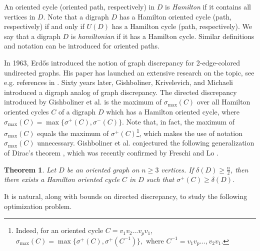 \documentclass{article}
\newtheorem{theorem}{Theorem}[section]
\newcommand{\GGnn}[1]{{#1}}
\newcommand{\2}{\vspace{0.2cm}}
\begin{document}
An oriented cycle (oriented path, respectively) in $D$ is \emph{Hamilton} if it contains all vertices in $D$. Note that a digraph $D$ has a Hamilton oriented cycle (path, respectively) if and only if $U(D)$ has a Hamilton cycle (path, respectively). We say that a digraph $D$ is \emph{hamiltonian} if it has a Hamilton cycle. Similar definitions and notation can be introduced for oriented paths.




\GGnn{In 1963, Erd{\H o}s \cite{Erd63} introduced the notion of graph discrepancy for 2-edge-colored undirected graphs. His paper has launched an extensive research on the topic, see e.g. references in \cite{FL24,GKM23}. Sixty years later, Gishboliner, Krivelevich, and Michaeli \cite{GKM23} introduced a digraph analog of graph discrepancy. The directed discrepancy introduced by Gishboliner et al.  is the maximum of $\sigma_{\max}(C)$ over all Hamilton oriented cycles $C$ of a digraph $D$ which has a Hamilton oriented cycle, where $\sigma_{\max}(C)=\max\{\sigma^+(C),\sigma^-(C)\}$. Note that, in fact, the maximum of $\sigma_{\max}(C)$ equals the maximum of $\sigma^+(C)$\footnote{Indeed, for an oriented cycle $C=v_1v_2\dots v_pv_1$, $\sigma_{\max}(C)=\max\{\sigma^+(C),\sigma^+(C^{-1})\},$ where $C^{-1}=v_1v_p\dots ,v_2v_1$.}, which makes the use of notation $\sigma_{\max}(C)$ unnecessary.}
Gishboliner et al.  conjectured the following generalization of Dirac's theorem \cite{D52}, which was recently confirmed by Freschi and Lo \cite{FL24}. 

\begin{theorem}\label{Dirac-type theorem}
	Let $D$ be an oriented graph on $n\ge 3$ vertices. If $\delta(D) \ge \frac{n}{2}$, then there exists a Hamilton oriented cycle $C$ in $D$ such that \GGnn{$\sigma^+(C)\ge \delta(D)$.}
\end{theorem}

\GGnn{It is natural, along with bounds on  directed discrepancy, to study the following optimization problem.}
\end{document}
